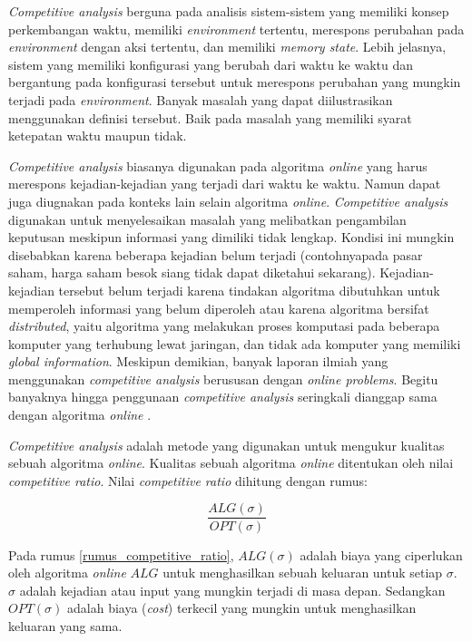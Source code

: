 \par \textit{Competitive analysis} berguna pada analisis sistem-sistem yang memiliki konsep perkembangan waktu, memiliki \textit{environment} tertentu, merespons perubahan pada \textit{environment} dengan aksi tertentu, dan memiliki \textit{memory state}. Lebih jelasnya, sistem yang memiliki konfigurasi yang berubah dari waktu ke waktu dan bergantung pada konfigurasi tersebut untuk merespons perubahan yang mungkin terjadi pada \textit{environment}. Banyak masalah yang dapat diilustrasikan menggunakan definisi tersebut. Baik pada masalah yang memiliki syarat ketepatan waktu maupun tidak.

\par \textit{Competitive analysis} biasanya digunakan pada algoritma \textit{online} yang harus merespons kejadian-kejadian yang terjadi dari waktu ke waktu. Namun dapat juga diugnakan pada konteks lain selain algoritma \textit{online}. \textit{Competitive analysis} digunakan untuk menyelesaikan masalah yang melibatkan pengambilan keputusan meskipun informasi yang dimiliki tidak lengkap. Kondisi ini mungkin disebabkan karena beberapa kejadian belum terjadi (contohnyapada pasar saham, harga saham besok siang tidak dapat diketahui sekarang). Kejadian-kejadian tersebut belum terjadi karena tindakan algoritma dibutuhkan untuk memperoleh informasi yang belum diperoleh atau karena algoritma bersifat \textit{distributed}, yaitu algoritma yang melakukan proses komputasi pada beberapa komputer yang terhubung lewat jaringan, dan tidak ada komputer yang memiliki \textit{global information}. Meskipun demikian, banyak   laporan ilmiah yang menggunakan \textit{competitive analysis} berususan dengan \textit{online problems}. Begitu banyaknya  hingga penggunaan \textit{competitive analysis} seringkali dianggap sama dengan algoritma \textit{online} \cite{algo_online_2:98}.

\textit{Competitive analysis} adalah metode yang digunakan untuk mengukur kualitas sebuah algoritma \textit{online}. Kualitas sebuah algoritma \textit{online} ditentukan oleh nilai \textit{competitive ratio}. Nilai \textit{competitive ratio} dihitung dengan rumus: 

\begin{equation}\label{rumus_competitive_ratio}
\frac{ALG(\sigma)}{OPT(\sigma)}
\end{equation}

Pada rumus \ref{rumus_competitive_ratio}, $ALG(\sigma)$ adalah biaya yang ciperlukan oleh algoritma \textit{online} $ALG$ untuk menghasilkan sebuah keluaran untuk setiap $\sigma$. $\sigma$ adalah kejadian atau input yang mungkin terjadi di masa depan. Sedangkan $OPT(\sigma)$ adalah biaya (\textit{cost}) terkecil yang mungkin untuk menghasilkan keluaran yang sama.

